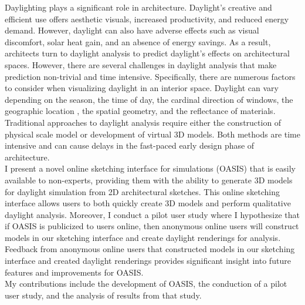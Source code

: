 Daylighting plays a significant role in architecture.
Daylight's creative and efficient use offers aesthetic visuals, increased productivity, and reduced energy demand. 
However, daylight can also have adverse effects such as visual discomfort, solar heat gain, and an absence of energy savings. 
As a result, architects turn to daylight analysis to predict daylight's effects on architectural spaces. However, there are several challenges in daylight analysis that make prediction non-trivial and time intensive. Specifically, there are numerous factors to consider when visualizing daylight in an interior space. Daylight can vary depending on the season, the time of day, the cardinal direction of windows, the geographic location , the spatial geometry, and the reflectance of materials. Traditional approaches to daylight analysis require either the construction of physical scale model or development of virtual 3D models. Both methods are time intensive and can cause delays in the fast-paced early design phase of architecture. \\

I present a novel online sketching interface for simulations (OASIS) that is easily available to non-experts, providing them with the ability to generate 3D models for daylight simulation from 2D architectural sketches. This online sketching interface allows users to both quickly create 3D models and perform qualitative daylight analysis. Moreover, I conduct a pilot user study where I hypothesize that if OASIS is publicized to users online, then anonymous online users will construct models in our sketching interface and create daylight renderings for analysis. Feedback from anonymous online users that constructed models in our sketching interface and created daylight renderings provides significant insight into future features and improvements for OASIS. \\

My contributions include the development of OASIS, the conduction of a pilot user study, and the analysis of results from that study. \\
